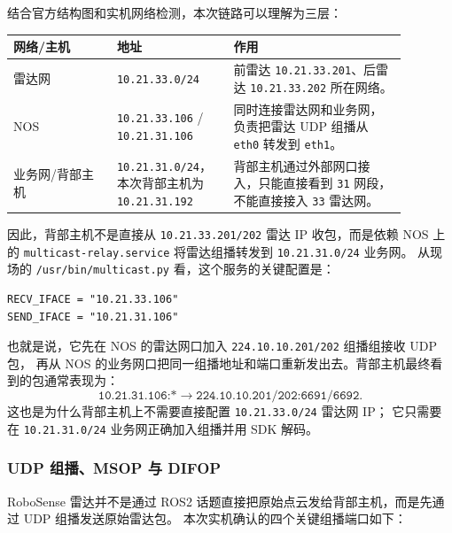 \documentclass[UTF8,11pt,a4paper]{ctexart}
\begin{document}
结合官方结构图和实机网络检测，本次链路可以理解为三层：

\begin{center}
\renewcommand{\arraystretch}{1.25}
\begin{tabular}{p{0.24\linewidth}p{0.24\linewidth}p{0.40\linewidth}}
\toprule
\textbf{网络/主机} & \textbf{地址} & \textbf{作用}\\
\midrule
雷达网 & \texttt{10.21.33.0/24} & 前雷达 \texttt{10.21.33.201}、后雷达 \texttt{10.21.33.202} 所在网络。\\
NOS & \texttt{10.21.33.106} / \texttt{10.21.31.106} & 同时连接雷达网和业务网，负责把雷达 UDP 组播从 \texttt{eth0} 转发到 \texttt{eth1}。\\
业务网/背部主机 & \texttt{10.21.31.0/24}，本次背部主机为 \texttt{10.21.31.192} & 背部主机通过外部网口接入，只能直接看到 \texttt{31} 网段，不能直接接入 \texttt{33} 雷达网。\\
\bottomrule
\end{tabular}
\end{center}

因此，背部主机不是直接从 \texttt{10.21.33.201/202} 雷达 IP 收包，而是依赖 NOS 上的
\texttt{multicast-relay.service} 将雷达组播转发到 \texttt{10.21.31.0/24} 业务网。
从现场的 \texttt{/usr/bin/multicast.py} 看，这个服务的关键配置是：

\begin{verbatim}
RECV_IFACE = "10.21.33.106"
SEND_IFACE = "10.21.31.106"
\end{verbatim}

也就是说，它先在 NOS 的雷达网口加入 \texttt{224.10.10.201/202} 组播组接收 UDP 包，
再从 NOS 的业务网口把同一组播地址和端口重新发出去。背部主机最终看到的包通常表现为：
\[
\texttt{10.21.31.106:*}
\rightarrow
\texttt{224.10.10.201/202:6691/6692}.
\]
这也是为什么背部主机上不需要直接配置 \texttt{10.21.33.0/24} 雷达网 IP；
它只需要在 \texttt{10.21.31.0/24} 业务网正确加入组播并用 SDK 解码。

\subsubsection{UDP 组播、MSOP 与 DIFOP}

RoboSense 雷达并不是通过 ROS2 话题直接把原始点云发给背部主机，而是先通过 UDP 组播发送原始雷达包。
本次实机确认的四个关键组播端口如下：
\end{document}
